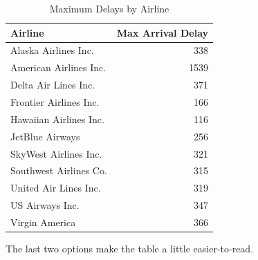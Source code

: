 \documentclass[12pt,twoside]{reedthesis}
\begin{document}
\begin{longtable}[t]{lr}
\caption[Max Delays by Airline]{\label{tab:maxdelays}Maximum Delays by Airline}\\
\toprule
Airline & Max Arrival Delay\\
\midrule
Alaska Airlines Inc. & 338\\
American Airlines Inc. & 1539\\
Delta Air Lines Inc. & 371\\
Frontier Airlines Inc. & 166\\
Hawaiian Airlines Inc. & 116\\
\addlinespace
JetBlue Airways & 256\\
SkyWest Airlines Inc. & 321\\
Southwest Airlines Co. & 315\\
United Air Lines Inc. & 319\\
US Airways Inc. & 347\\
\addlinespace
Virgin America & 366\\
\bottomrule
\end{longtable}
The last two options make the table a little easier-to-read.
\end{document}
